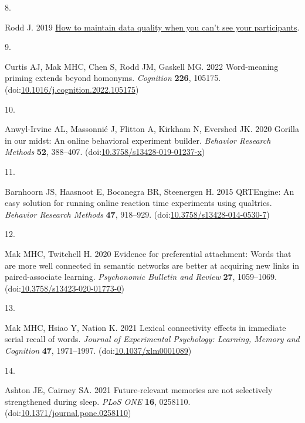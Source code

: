 \documentclass[
]{article}
\newlength{\cslhangindent}
\newlength{\csllabelwidth}
\newlength{\cslentryspacingunit} %
\newenvironment{CSLReferences}[2] %
 {%
  \setlength{\parindent}{0pt}
  \ifodd #1
  \let\oldpar\par
  \def\par{\hangindent=\cslhangindent\oldpar}
  \fi
  \setlength{\parskip}{#2\cslentryspacingunit}
 }%
 {}
\newcommand{\CSLLeftMargin}[1]{\parbox[t]{\csllabelwidth}{#1}}
\newcommand{\CSLRightInline}[1]{\parbox[t]{\linewidth - \csllabelwidth}{#1}\break}
\begin{document}
\begin{CSLReferences}{0}{0}
\leavevmode{}%
\CSLLeftMargin{8. }%
\CSLRightInline{Rodd J. 2019 \href{https://www.psychologicalscience.org/observer/how-to-maintain-data-quality-when-you-cant-see-your-participants}{How to maintain data quality when you can't see your participants}. }

\leavevmode{}%
\CSLLeftMargin{9. }%
\CSLRightInline{Curtis AJ, Mak MHC, Chen S, Rodd JM, Gaskell MG. 2022 Word-meaning priming extends beyond homonyms. \emph{Cognition} \textbf{226}, 105175. (doi:\href{https://doi.org/10.1016/j.cognition.2022.105175}{10.1016/j.cognition.2022.105175})}

\leavevmode{}%
\CSLLeftMargin{10. }%
\CSLRightInline{Anwyl-Irvine AL, Massonnié J, Flitton A, Kirkham N, Evershed JK. 2020 Gorilla in our midst: An online behavioral experiment builder. \emph{Behavior Research Methods} \textbf{52}, 388--407. (doi:\href{https://doi.org/10.3758/s13428-019-01237-x}{10.3758/s13428-019-01237-x})}

\leavevmode{}%
\CSLLeftMargin{11. }%
\CSLRightInline{Barnhoorn JS, Haasnoot E, Bocanegra BR, Steenergen H. 2015 QRTEngine: An easy solution for running online reaction time experiments using qualtrics. \emph{Behavior Research Methods} \textbf{47}, 918--929. (doi:\href{https://doi.org/10.3758/s13428-014-0530-7}{10.3758/s13428-014-0530-7})}

\leavevmode{}%
\CSLLeftMargin{12. }%
\CSLRightInline{Mak MHC, Twitchell H. 2020 Evidence for preferential attachment: Words that are more well connected in semantic networks are better at acquiring new links in paired-associate learning. \emph{Psychonomic Bulletin and Review} \textbf{27}, 1059--1069. (doi:\href{https://doi.org/10.3758/s13423-020-01773-0}{10.3758/s13423-020-01773-0})}

\leavevmode{}%
\CSLLeftMargin{13. }%
\CSLRightInline{Mak MHC, Hsiao Y, Nation K. 2021 Lexical connectivity effects in immediate serial recall of words. \emph{Journal of Experimental Psychology: Learning, Memory and Cognition} \textbf{47}, 1971--1997. (doi:\href{https://doi.org/10.1037/xlm0001089}{10.1037/xlm0001089})}

\leavevmode{}%
\CSLLeftMargin{14. }%
\CSLRightInline{Ashton JE, Cairney SA. 2021 Future-relevant memories are not selectively strengthened during sleep. \emph{PLoS ONE} \textbf{16}, 0258110. (doi:\href{https://doi.org/10.1371/journal.pone.0258110}{10.1371/journal.pone.0258110})}


\end{CSLReferences}
\end{document}
